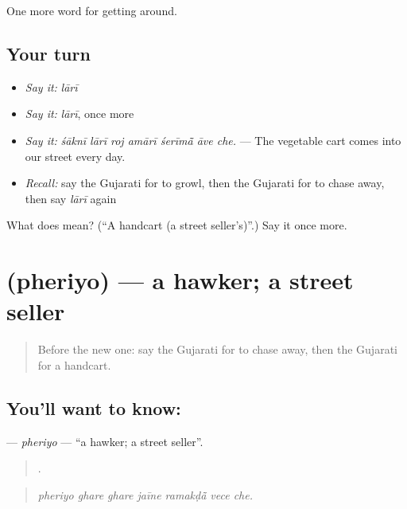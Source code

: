 \begin{grammarlens}[title={What you've built}]
One more word for getting around.
\end{grammarlens}

\subsection*{Your turn}
\begin{itemize}
\raggedright
  \item \emph{Say it:} \emph{lārī}
  \item \emph{Say it:} \emph{lārī}, once more
  \item \emph{Say it:} \emph{śāknī lārī roj amārī śerīmā̃ āve che.} — The vegetable cart comes into our street every day.
  \item \emph{Recall:} say the Gujarati for to growl, then the Gujarati for to chase away, then say \emph{lārī} again
\end{itemize}

\begin{tcolorbox}[breakable,colback=teal!4,colframe=teal!35!black,title={Before you move on}]
What does  mean? (\textquotedblleft{}A handcart (a street seller's)\textquotedblright{}.) Say it once more.
\end{tcolorbox}
\section[\texorpdfstring{\gu{ફેરિયો} (pheriyo)}{ફેરિયો (pheriyo)}]{ (pheriyo) — a hawker; a street seller}

\label{lesson:GU-C422-pheriyo}



\begin{quote}
Before the new one: say the Gujarati for to chase away, then the Gujarati for a handcart.
\end{quote}

\subsection*{You'll want to know: }
\textbf{} — \emph{pheriyo} — \textquotedblleft{}a hawker; a street seller\textquotedblright{}.

\begin{quote}
      .
\end{quote}

\begin{quote}
\emph{pheriyo ghare ghare jaīne ramakḍā̃ vece che.}
\end{quote}

